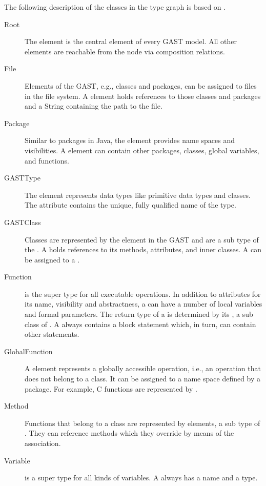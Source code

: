 The following description of the classes in the type graph is based on \cite{Tra11}.

\begin{description}
\item[Root] The  element is the central element of every GAST model. All other elements are reachable from the  node via composition relations.
\item[File] Elements of the GAST, e.g., classes and packages, can be assigned to files in the file system. A  element holds references to those classes and packages and a String containing the path to the file.
\item[Package] Similar to packages in Java, the  element provides name spaces and visibilities. A  element can contain other packages, classes, global variables, and functions.
\item[GASTType] The  element represents data types like primitive data types and classes. The attribute  contains the unique, fully qualified name of the type.
\item[GASTClass] Classes are represented by the element  in the GAST and are a sub type of the . A  holds references to its methods, attributes, and inner classes. A  can be assigned to a .
\item[Function]  is the super type for all executable operations. In addition to attributes for its name, visibility and abstractness, a  can have a number of local variables and formal parameters. The return type of a  is determined by its , a sub class of . A  always contains a block statement which, in turn, can contain other statements.
\item[GlobalFunction] A  element represents a globally accessible operation, i.e., an operation that does not belong to a class. It can be assigned to a name space defined by a package. For example, C functions are represented by .
\item[Method] Functions that belong to a class are represented by  elements, a sub type of . They can reference methods which they override by means of the  association.
\item[Variable]  is a super type for all kinds of variables. A  always has a name and a type.

\end{description}
